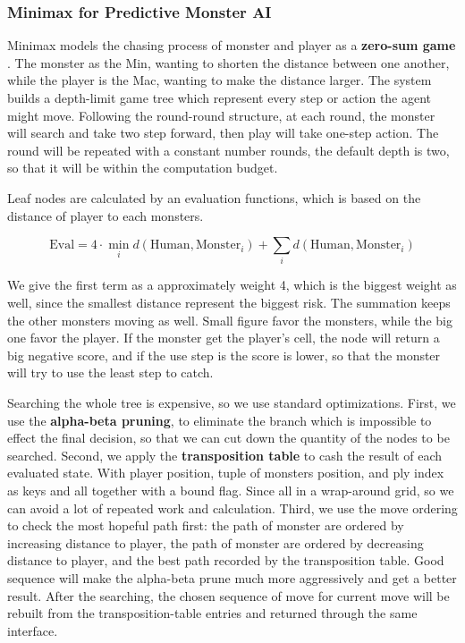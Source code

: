 \documentclass[12pt,a4paper]{article}
\begin{document}
\subsubsection{Minimax for Predictive Monster AI}

Minimax models the chasing process of monster and player as a \textbf{zero-sum game} \cite{knuth1975alphabeta,russell2020aima}. The monster as the Min, wanting to shorten the distance between one another, while the player is the Mac, wanting to make the distance larger. The system builds a depth-limit game tree which represent every step or action the agent might move. Following the round-round structure, at each round, the monster will search and take two step forward, then play will take one-step action. The round will be repeated with a constant number rounds, the default depth is two, so that it will be within the computation budget.

Leaf nodes are calculated by an evaluation functions, which is based on the distance of player to each monsters.

\[
\text{Eval} = 4 \cdot \min_i d(\text{Human}, \text{Monster}_i)
+ \sum_i d(\text{Human}, \text{Monster}_i)
\]

We give the first term as a approximately weight 4, which is the biggest weight as well, since the smallest distance represent the biggest risk. The summation keeps the other monsters moving as well. Small figure favor the monsters, while the big one favor the player. If the monster get the player's cell, the node will return a big negative score, and if the use step is the score is lower, so that the monster will try to use the least step to catch.

Searching the whole tree is expensive, so we use standard optimizations. First, we use the \textbf{alpha-beta pruning}, to eliminate the branch which is impossible to effect the final decision, so that we can cut down the quantity of the nodes to be searched. Second, we apply the \textbf{transposition table} to cash the result of each evaluated state. With player position, tuple of monsters position, and ply index as keys and all together with a bound flag. Since all in a wrap-around grid, so we can avoid a lot of repeated work and calculation. Third, we use the move ordering to check the most hopeful path first: the path of monster are ordered by increasing distance to player, the path of monster are ordered by decreasing distance to player, and the best path recorded by the transposition table. Good sequence will make the alpha-beta prune much more aggressively and get a better result. After the searching, the chosen sequence of move for current move will be rebuilt from the transposition-table entries and returned through the same interface.
\end{document}
